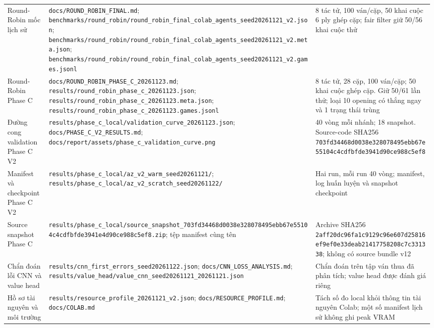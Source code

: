 \documentclass[11pt, a4paper]{article}
\begin{document}
\begin{longtable}{@{}p{3.4cm}p{7.1cm}p{4.0cm}@{}}
    Round-Robin mốc lịch sử
    & \texttt{docs/ROUND\_ROBIN\_FINAL.md};
      \texttt{benchmarks/round\_robin/round\_robin\_final\_colab\_agents\_seed20261121\_v2.json};
      \texttt{benchmarks/round\_robin/round\_robin\_final\_colab\_agents\_seed20261121\_v2.meta.json};
      \texttt{benchmarks/round\_robin/round\_robin\_final\_colab\_agents\_seed20261121\_v2.games.jsonl}
    & 8 tác tử, 100 ván/cặp, 50 khai cuộc 6 ply ghép cặp; fair filter giữ 50/56 khai cuộc thử \\

    Round-Robin Phase C
    & \texttt{docs/ROUND\_ROBIN\_PHASE\_C\_20261123.md};
      \texttt{results/round\_robin\_phase\_c\_20261123.json};
      \texttt{results/round\_robin\_phase\_c\_20261123.meta.json};
      \texttt{results/round\_robin\_phase\_c\_20261123.games.jsonl}
    & 8 tác tử, 28 cặp, 100 ván/cặp; 50 khai cuộc ghép cặp. Giữ 50/61 lần thử; loại 10 opening có thắng ngay và 1 trạng thái trùng \\

    Đường cong validation Phase C V2
    & \texttt{results/phase\_c\_local/validation\_curve\_20261123.json};
      \texttt{docs/PHASE\_C\_V2\_RESULTS.md};
      \texttt{docs/report/assets/phase\_c\_validation\_curve.png}
    & 40 vòng mỗi nhánh; 18 snapshot. Source-code SHA256
      \texttt{703fd34468d0038e328078495ebb67e55104c4cdfbfde3941d90ce988c5ef8} \\

    Manifest và checkpoint Phase C V2
    & \texttt{results/phase\_c\_local/az\_v2\_warm\_seed20261121/};
      \texttt{results/phase\_c\_local/az\_v2\_scratch\_seed20261122/}
    & Hai run, mỗi run 40 vòng; manifest, log huấn luyện và snapshot checkpoint \\

    Source snapshot Phase C
    & \texttt{results/phase\_c\_local/source\_snapshot\_703fd34468d0038e328078495ebb67e55104c4cdfbfde3941e4d90ce988c5ef8.zip};
      tệp manifest cùng tên
    & Archive SHA256
      \texttt{2aff20dc96fa1c9129c96e607d25816ef9ef0e33deab21417758208c7c331338};
      không có source bundle v12 \\

    Chẩn đoán lỗi CNN và value head
    & \texttt{results/cnn\_first\_errors\_seed20261122.json};
      \texttt{docs/CNN\_LOSS\_ANALYSIS.md};
      \texttt{results/value\_head/value\_cnn\_seed20261121\_20261121.json}
    & Chẩn đoán trên tập ván thua đã phân tích; value head được đánh giá riêng \\

    Hồ sơ tài nguyên và môi trường
    & \texttt{results/resource\_profile\_20261121\_v2.json};
      \texttt{docs/RESOURCE\_PROFILE.md};
      \texttt{docs/COLAB.md}
    & Tách số đo local khỏi thông tin tài nguyên Colab; một số manifest lịch sử không ghi peak VRAM \\
\end{longtable}
\normalsize
\end{document}
